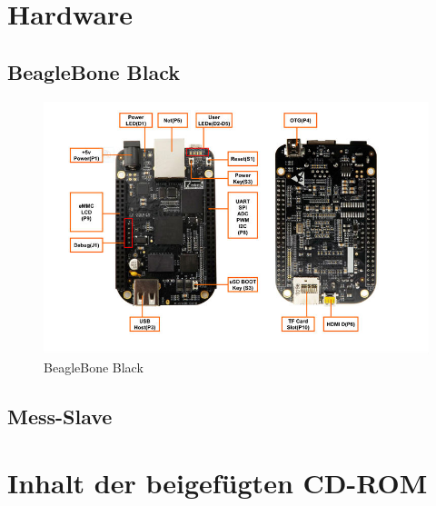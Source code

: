 \begin{appendix}

 {}

\chapter{Hardware}
\label{anhang_Schaltung}

\section{BeagleBone Black}
\label{anhang_BBB}
\begin{figure}[h]
\begin{center}
\includegraphics[width=\textwidth]{img/general/BeagleBeschreibung.jpg}
\caption{BeagleBone Black}
\label{figure_BeschreibungBeagle}
\end{center}
\end{figure}


\section{Mess-Slave}
\label{anhang_Slave}


\newpage



\chapter{Inhalt der beigefügten CD-ROM}
\label{anhang_cd}


\end{appendix}
